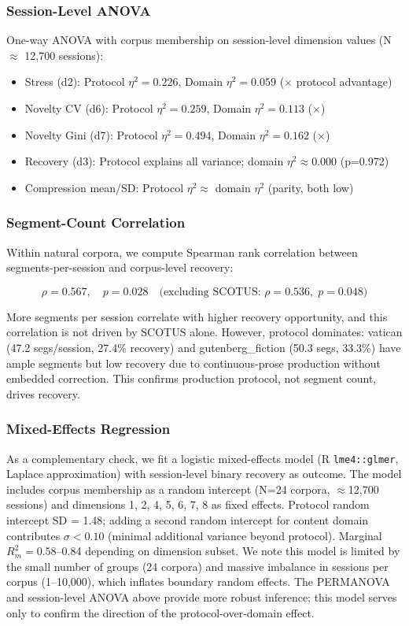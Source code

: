 \documentclass[11pt]{article}
\begin{document}
\subsubsection{Session-Level ANOVA}

One-way ANOVA with corpus membership on session-level dimension values (N $\approx$ 12,700 sessions):

\begin{itemize}
\item Stress (d2): Protocol $\eta^2 = 0.226$, Domain $\eta^2 = 0.059$ (\anovaStressRatio$\times$ protocol advantage)
\item Novelty CV (d6): Protocol $\eta^2 = 0.259$, Domain $\eta^2 = 0.113$ (\anovaNoveltyCVRatio$\times$)
\item Novelty Gini (d7): Protocol $\eta^2 = 0.494$, Domain $\eta^2 = 0.162$ (\anovaNoveltyGiniRatio$\times$)
\item Recovery (d3): Protocol explains all variance; domain $\eta^2 \approx 0.000$ (p=0.972)
\item Compression mean/SD: Protocol $\eta^2 \approx$ domain $\eta^2$ (parity, both low)
\end{itemize}

\subsubsection{Segment-Count Correlation}

Within natural corpora, we compute Spearman rank correlation between segments-per-session and corpus-level recovery:

\[\rho = 0.567, \quad p = 0.028 \quad \text{(excluding SCOTUS: } \rho = 0.536, \; p = 0.048\text{)}\]

More segments per session correlate with higher recovery opportunity, and this correlation is not driven by SCOTUS alone. However, protocol dominates: vatican (47.2 segs/session, 27.4\% recovery) and gutenberg\_fiction (50.3 segs, 33.3\%) have ample segments but low recovery due to continuous-prose production without embedded correction. This confirms production protocol, not segment count, drives recovery.

\subsubsection{Mixed-Effects Regression}

As a complementary check, we fit a logistic mixed-effects model (R \texttt{lme4::glmer}, Laplace approximation) with session-level binary recovery as outcome. The model includes corpus membership as a random intercept (N=24 corpora, $\approx$12,700 sessions) and dimensions 1, 2, 4, 5, 6, 7, 8 as fixed effects. Protocol random intercept SD = 1.48; adding a second random intercept for content domain contributes $\sigma < 0.10$ (minimal additional variance beyond protocol). Marginal $R^2_m = 0.58$--0.84 depending on dimension subset. We note this model is limited by the small number of groups (24 corpora) and massive imbalance in sessions per corpus (1--10,000), which inflates boundary random effects. The PERMANOVA and session-level ANOVA above provide more robust inference; this model serves only to confirm the direction of the protocol-over-domain effect.
\end{document}
